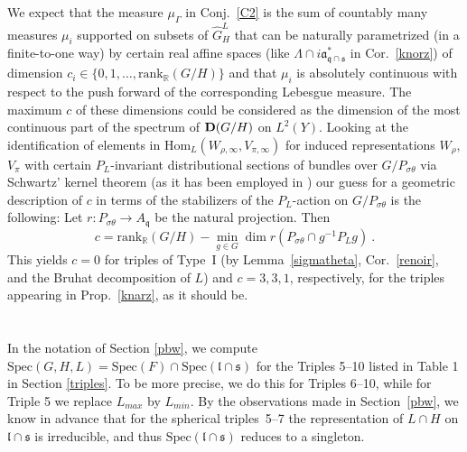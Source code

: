 \documentclass[10]{amsart}
\theoremstyle{remark}
\theoremstyle{definition}
\numberwithin{equation}{section}
\newcommand{\R}{\mathbb{R}}           %
\newcommand{\rank}{\text{rank}}
\newcommand{\Hom}{\mathrm{Hom}}
\newcommand{\fa}{{\mathfrak a}}             %
\newcommand{\fk}{{\mathfrak k}}
\newcommand{\fl}{{\mathfrak l}}
\newcommand{\fq}{{\mathfrak q}}
\newcommand{\fs}{{\mathfrak s}}
\begin{document}
{We expect that the measure $\mu_\Gamma$ in Conj.~\ref{C2} is the sum of countably many measures $\mu_i$ supported on subsets of $\widehat G_H^L$ that can be naturally parametrized (in a finite-to-one way) by
certain real affine spaces (like $\Lambda\cap i\fa_{\fq\cap\fs}^*$ in Cor.~\ref{knorz}) of dimension $c_i\in\{0,1,\dots,\rank_\R(G/H)\}$ and that $\mu_i$ is absolutely continuous with respect to the push forward of the corresponding Lebesgue measure. The maximum $c$ of these dimensions could be considered as the dimension of the most continuous part of the
spectrum of ${\bf D}(G/H)$ on $L^2(Y)$. Looking at the identification of elements in $\Hom_L(W_{\rho,\infty}, V_{\pi,\infty})$ for induced representations $W_\rho$, $V_\pi$ with
certain $P_L$-invariant distributional sections of bundles over $G/P_{\sigma\theta}$ via Schwartz' kernel theorem (as it has been employed in \cite{Mol17})  our guess for a
geometric description of $c$ in terms of the stabilizers of the $P_L$-action on $G/P_{\sigma\theta}$ is the following: Let $r: P_{\sigma\theta}\rightarrow A_\fq$ be the natural projection.
Then 
$$ c=\rank_\R(G/H)-\min_{g\in G} \dim r\left (P_{\sigma\theta} \cap g^{-1}P_Lg\right )\ .$$
This yields $c=0$ for triples of Type~I (by Lemma~\ref{sigmatheta}, Cor.~\ref{renoir}, and the Bruhat decomposition of $L$) and $c=3,3,1$, respectively, for the triples appearing in Prop.~\ref{knarz}, as it should be.


\appendix
\section{}\label{A}
In the notation of Section \ref{pbw}, we compute $\mathrm{Spec}(G,H,L) =\text{Spec}(F)\cap\text{Spec}(\fl\cap\fs)$ for the Triples 5--10 listed in Table 1 in Section \ref{triples}.
To be more precise, we do this for Triples 6--10, while for Triple 5 we replace $L_{max}$ by $L_{min}$. By the observations made in Section~\ref{pbw}, we  know in advance
that for the spherical triples~5--7 the representation of $L\cap H$ on $\fl\cap \fs$ is irreducible, and thus $\text{Spec}(\fl\cap\fs)$ reduces to a singleton.
\vspace*{0.3cm}


}
\end{document}
